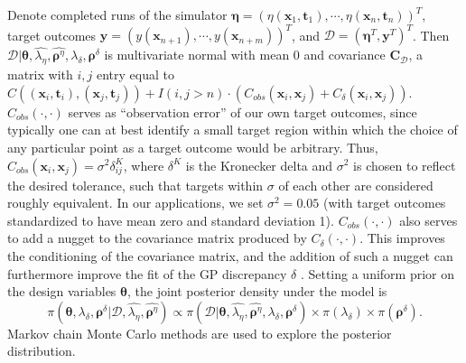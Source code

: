\documentclass[12pt]{article}
\begin{document}
%
Denote completed runs of the simulator $\boldsymbol \eta = (\eta(\mathbf x_1,\mathbf t_1),\cdots,\eta(\mathbf x_n,\mathbf t_n))^T$, target outcomes $\mathbf y = (y(\mathbf x_{n+1}),\cdots,y(\mathbf x_{n+m}))^T$,
and $\mathcal D = (\boldsymbol \eta^T,\mathbf y^T)^T$.
%
Then $\mathcal D | \boldsymbol \theta,\widehat{\lambda_\eta}, \widehat{\boldsymbol \rho^\eta},\lambda_\delta,\boldsymbol \rho^\delta$ is multivariate normal with mean 0 and covariance $\mathbf C_\mathcal D$, a matrix with $i,j$ entry equal to
$
C((\mathbf x_i,\mathbf t_i),(\mathbf x_j,\mathbf t_j)) + I(i,j>n)\cdot(C_{obs}(\mathbf x_i,\mathbf x_j) + C_\delta(\mathbf x_i,\mathbf x_j)).
$
%
$C_{obs}(\cdot,\cdot)$ serves as ``observation error'' of our own target outcomes, since typically one can at best identify a small target region within which the choice of any particular point as a target outcome would be arbitrary.
%
Thus, $C_{obs}(\mathbf x_i,\mathbf x_j) = \sigma^2\delta^K_{ij}$, where $\delta^K$ is the Kronecker delta and $\sigma^2$ is chosen to reflect the desired tolerance, such that targets within $\sigma$ of each other are considered roughly equivalent.
%
%
In our applications, we set $\sigma^2=0.05$ (with target outcomes standardized to have mean zero and standard deviation 1).
%
$C_{obs}(\cdot,\cdot)$ also serves to add a nugget to the covariance matrix produced by $C_\delta(\cdot,\cdot)$.
%
This improves the conditioning of the covariance matrix, and the addition of such a nugget can furthermore improve the fit of the GP discrepancy $\delta$ \citep{Gramacy2012}.
%
Setting a uniform prior on the design variables $\boldsymbol\theta$, the joint posterior density under the model is
%
\begin{equation} \label{eq:full_dist}
\pi(\boldsymbol \theta,\lambda_\delta,\boldsymbol \rho^\delta|\mathcal D,\widehat{\lambda_\eta},\widehat{\boldsymbol \rho^\eta})
\propto \pi(\mathcal D | \boldsymbol \theta,\widehat{\lambda_\eta}, \widehat{\boldsymbol \rho^\eta},\lambda_\delta,\boldsymbol \rho^\delta) \times %
\pi(\lambda_\delta) \times \pi(\boldsymbol \rho^\delta).
\end{equation}
%
Markov chain Monte Carlo methods are used to explore the posterior distribution.
\end{document}
